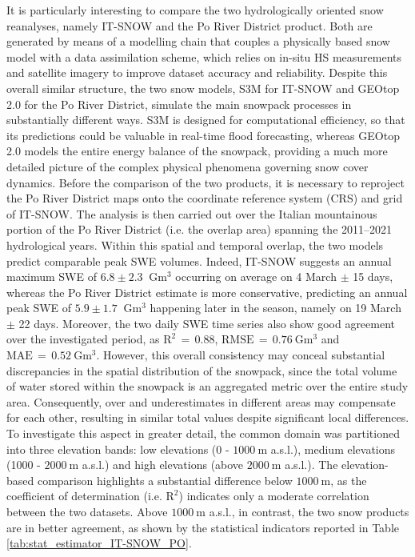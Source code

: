 It is particularly interesting to compare the two hydrologically oriented snow reanalyses, namely IT-SNOW and the Po River District product. Both 
are generated by means of a modelling chain that couples a physically based snow model with a data assimilation scheme, which relies on in-situ HS measurements and satellite 
imagery to improve dataset accuracy and reliability. Despite this overall similar structure, the two snow models, S3M for IT-SNOW and GEOtop 2.0 
for the Po River District, simulate the main snowpack processes in substantially different ways. S3M is designed for computational efficiency, so that its 
predictions could be valuable in real-time flood forecasting, whereas GEOtop 2.0 models the entire energy balance of the snowpack, providing a much more 
detailed picture of the complex physical phenomena governing snow cover dynamics. Before the comparison of the two products, it is necessary to reproject
the Po River District maps onto the coordinate reference system (CRS) and grid of IT-SNOW. The analysis is then carried out over the Italian mountainous 
portion of the Po River District (i.e. the overlap area) spanning the 2011--2021 hydrological years. Within this spatial and temporal overlap, the 
two models predict comparable peak SWE volumes. Indeed,  
IT-SNOW suggests an annual maximum SWE of $6.8 \pm 2.3\,\,\SI{}{\giga\meter\cubed}$ occurring on average on 4 March $\pm$ 15 days, whereas the Po River District 
estimate is more conservative, predicting an annual peak SWE of $5.9 \pm 1.7\,\,\SI{}{\giga\meter\cubed}$ happening later in the season, namely on 19 March $\pm$ 
22 days. Moreover, the two daily SWE time series also show good agreement over the investigated period, as $\text{R}^2\,=\,0.88$, $\text{RMSE}\,=\,\SI{0.76}{\giga\meter\cubed}$ 
and $\text{MAE}\,=\,\SI{0.52}{\giga\meter\cubed}$. However, this overall consistency may conceal substantial discrepancies in the spatial distribution of 
the snowpack, since the total volume of water stored within the snowpack is an aggregated metric over the entire study area. Consequently, over and 
underestimates in different areas may compensate for each other, resulting in similar total values despite significant local differences. To investigate 
this aspect in greater detail, the common domain was partitioned into three elevation bands: low elevations (\num{0} - $\SI{1000}{\meter}$ a.s.l.), medium 
elevations (\num{1000} - $\SI{2000}{\meter}$ a.s.l.) and high elevations (above $\SI{2000}{\meter}$ a.s.l.). The elevation-based comparison highlights a 
substantial difference below $\SI{1000}{\meter}$, as the coefficient of determination (i.e. $\text{R}^2$) indicates only a moderate correlation between the two 
datasets. Above $\SI{1000}{\meter}$ a.s.l., in contrast, the two snow products are in better agreement, as shown by the statistical indicators reported in 
Table \ref{tab:stat_estimator_IT-SNOW_PO}.

